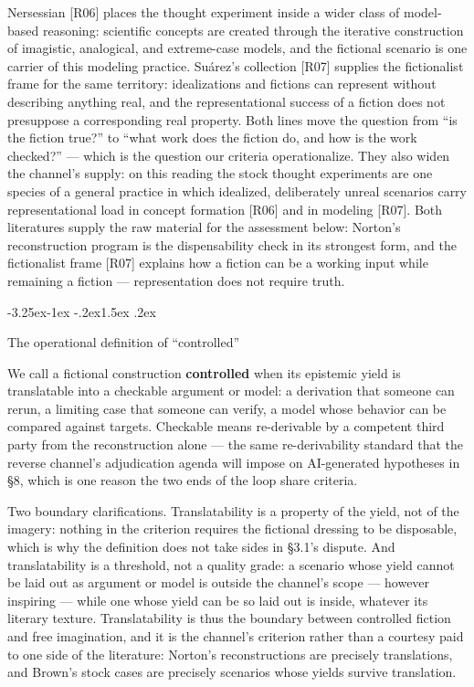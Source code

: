 \documentclass[11pt,a4paper]{article}
\makeatletter
\renewcommand\subsection{\@startsection{subsection}{2}{\z@}%
  {-3.25ex\@plus -1ex \@minus -.2ex}{1.5ex \@plus .2ex}%
  {\normalfont\large\bfseries\raggedright}}
\makeatother
\begin{document}
Nersessian [R06] places the thought experiment inside a wider class of model-based reasoning: scientific concepts are created through the iterative construction of imagistic, analogical, and extreme-case models, and the fictional scenario is one carrier of this modeling practice. Suárez's collection [R07] supplies the fictionalist frame for the same territory: idealizations and fictions can represent without describing anything real, and the representational success of a fiction does not presuppose a corresponding real property. Both lines move the question from ``is the fiction true?'' to ``what work does the fiction do, and how is the work checked?'' — which is the question our criteria operationalize. They also widen the channel's supply: on this reading the stock thought experiments are one species of a general practice in which idealized, deliberately unreal scenarios carry representational load in concept formation [R06] and in modeling [R07]. Both literatures supply the raw material for the assessment below: Norton's reconstruction program is the dispensability check in its strongest form, and the fictionalist frame [R07] explains how a fiction can be a working input while remaining a fiction — representation does not require truth.

\subsection{The operational definition of ``controlled''}

We call a fictional construction \textbf{controlled} when its epistemic yield is translatable into a checkable argument or model: a derivation that someone can rerun, a limiting case that someone can verify, a model whose behavior can be compared against targets. Checkable means re-derivable by a competent third party from the reconstruction alone — the same re-derivability standard that the reverse channel's adjudication agenda will impose on AI-generated hypotheses in §8, which is one reason the two ends of the loop share criteria.

Two boundary clarifications. Translatability is a property of the yield, not of the imagery: nothing in the criterion requires the fictional dressing to be disposable, which is why the definition does not take sides in §3.1's dispute. And translatability is a threshold, not a quality grade: a scenario whose yield cannot be laid out as argument or model is outside the channel's scope — however inspiring — while one whose yield can be so laid out is inside, whatever its literary texture. Translatability is thus the boundary between controlled fiction and free imagination, and it is the channel's criterion rather than a courtesy paid to one side of the literature: Norton's reconstructions are precisely translations, and Brown's stock cases are precisely scenarios whose yields survive translation.
\end{document}
